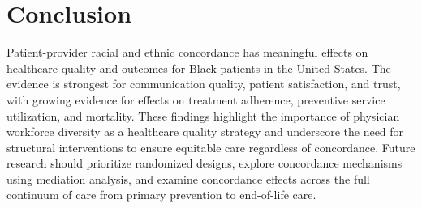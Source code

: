 \documentclass[12pt]{article}
\begin{document}
\section{Conclusion}

Patient-provider racial and ethnic concordance has meaningful effects on healthcare quality and outcomes for Black patients in the United States. The evidence is strongest for communication quality, patient satisfaction, and trust, with growing evidence for effects on treatment adherence, preventive service utilization, and mortality. These findings highlight the importance of physician workforce diversity as a healthcare quality strategy and underscore the need for structural interventions to ensure equitable care regardless of concordance. Future research should prioritize randomized designs, explore concordance mechanisms using mediation analysis, and examine concordance effects across the full continuum of care from primary prevention to end-of-life care.



\end{document}
